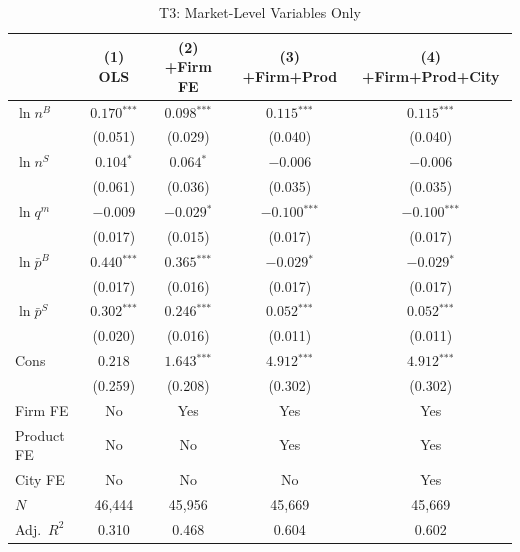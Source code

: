\documentclass[12pt]{article}
\newcommand{\sym}[1]{\ensuremath{^{\text{#1}}}}
\newcommand{\se}[1]{{\small(#1)}}
\begin{document}
\begin{table}[H]
  \centering
  \caption{T3: Market-Level Variables Only}
  \label{tab:t3}
  \begin{threeparttable}
    \begin{tabular}{lcccc}
      \toprule
      & (1) OLS & (2) +Firm FE & (3) +Firm+Prod & (4) +Firm+Prod+City \\
      \midrule
      \(\ln n^{B}\) & \(0.170\sym{***}\) & \(0.098\sym{***}\) & \(0.115\sym{***}\) & \(0.115\sym{***}\) \\
                    & \se{0.051} & \se{0.029} & \se{0.040} & \se{0.040} \\[4pt]
      \(\ln n^{S}\) & \(0.104\sym{*}\) & \(0.064\sym{*}\) & \(-0.006\) & \(-0.006\) \\
                    & \se{0.061} & \se{0.036} & \se{0.035} & \se{0.035} \\[4pt]
      \(\ln q^{m}\) & \(-0.009\) & \(-0.029\sym{*}\) & \(-0.100\sym{***}\) & \(-0.100\sym{***}\) \\
                    & \se{0.017} & \se{0.015} & \se{0.017} & \se{0.017} \\[4pt]
      \(\ln \bar{p}^{B}\) & \(0.440\sym{***}\) & \(0.365\sym{***}\) & \(-0.029\sym{*}\) & \(-0.029\sym{*}\) \\
                          & \se{0.017} & \se{0.016} & \se{0.017} & \se{0.017} \\[4pt]
      \(\ln \bar{p}^{S}\) & \(0.302\sym{***}\) & \(0.246\sym{***}\) & \(0.052\sym{***}\) & \(0.052\sym{***}\) \\
                          & \se{0.020} & \se{0.016} & \se{0.011} & \se{0.011} \\[4pt]
      Cons & \(0.218\) & \(1.643\sym{***}\) & \(4.912\sym{***}\) & \(4.912\sym{***}\) \\
               & \se{0.259} & \se{0.208} & \se{0.302} & \se{0.302} \\
      \midrule
      Firm FE    & No  & Yes & Yes & Yes \\
      Product FE & No  & No  & Yes & Yes \\
      City FE    & No  & No  & No  & Yes \\
      \(N\)      & 46,444 & 45,956 & 45,669 & 45,669 \\
      Adj.\ \(R^2\) & 0.310 & 0.468 & 0.604 & 0.602 \\
      \bottomrule
    \end{tabular}
  \end{threeparttable}
\end{table}
\end{document}
